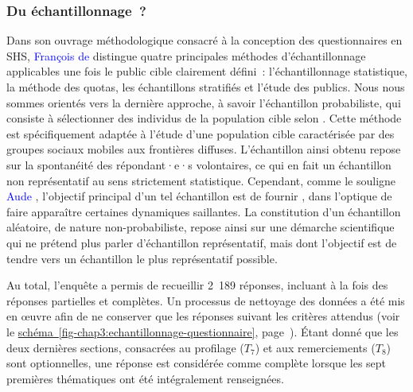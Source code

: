 \begin{refsegment}
\subsubsection*{Du  échantillonnage~?
    \label{chap3:administration-questionnaire-usagers-echantillon}
    }

Dans son ouvrage méthodologique consacré à la conception des questionnaires en \acrfull{SHS}, \textcolor{blue}{François de} \textcolor{blue}{\textcite[38-42]{singly_questionnaire_2016}} distingue quatre principales méthodes d’échantillonnage applicables une fois le public cible clairement défini~: l’échantillonnage statistique, la méthode des quotas, les échantillons stratifiés et l’étude des publics. Nous nous sommes orientés vers la dernière approche, à savoir l’échantillon probabiliste, qui consiste à sélectionner des individus de la population cible selon  \textcolor{blue}{\autocite[41]{singly_questionnaire_2016}}. Cette méthode est spécifiquement adaptée à l'étude d'une population cible caractérisée par des groupes sociaux mobiles aux frontières diffuses. L’échantillon ainsi obtenu repose sur la spontanéité des répondant·e·s volontaires, ce qui en fait un échantillon non représentatif au sens strictement statistique. Cependant, comme le souligne \textcolor{blue}{Aude} \textcolor{blue}{\textcite[69]{belfils_lepreuve_2002}}, l’objectif principal d’un tel échantillon est de fournir , dans l'optique de faire apparaître certaines dynamiques saillantes. La constitution d'un échantillon aléatoire, de nature non-probabiliste, repose ainsi sur une démarche scientifique qui ne prétend plus parler d'échantillon représentatif, mais dont l'objectif est de tendre vers un échantillon le plus représentatif possible.%

Au total, l'enquête a permis de recueillir 2~189 réponses, incluant à la fois des réponses partielles et complètes. Un processus de nettoyage des données a été mis en œuvre afin de ne conserver que les réponses suivant les critères attendus (voir le \hyperref[fig-chap3:echantillonnage-questionnaire]{schéma~\ref{fig-chap3:echantillonnage-questionnaire}}, page~\pageref{fig-chap3:echantillonnage-questionnaire}). Étant donné que les deux dernières sections, consacrées au profilage (\(T_{7}\)) et aux remerciements (\(T_{8}\)) sont optionnelles, une réponse est considérée comme complète lorsque les sept premières thématiques ont été intégralement renseignées.%


\end{refsegment}
